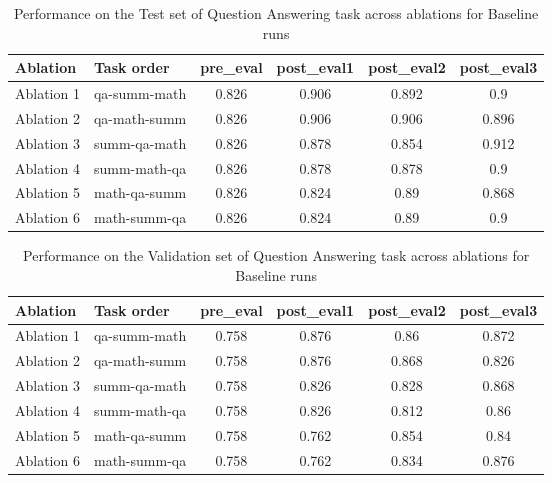 \begin{table}[!ht]
    \centering
    \caption{Performance on the Test set of Question Answering task across ablations for Baseline runs}
    \begin{tabular}{|l|l|S[table-format=2.4]|S[table-format=2.4]|S[table-format=2.4]|S[table-format=2.4]|}
    \hline
        \textbf{Ablation} & \textbf{Task order} & \textbf{pre\_eval} & \textbf{post\_eval1} & \textbf{post\_eval2} & \textbf{post\_eval3 } \\ \hline
        Ablation 1 & qa-summ-math & 0.826 & 0.906 & 0.892 & 0.9  \\ 
        Ablation 2 & qa-math-summ & 0.826 & 0.906 & 0.906 & 0.896  \\ 
        Ablation 3 & summ-qa-math & 0.826 & 0.878 & 0.854 & 0.912  \\ 
        Ablation 4 & summ-math-qa & 0.826 & 0.878 & 0.878 & 0.9  \\ 
        Ablation 5 & math-qa-summ & 0.826 & 0.824 & 0.89 & 0.868  \\ \hline
        Ablation 6 & math-summ-qa & 0.826 & 0.824 & 0.89 & 0.9  \\ \hline
    \end{tabular}
    \label{tab:QATestBaseline}
\end{table}

\begin{table}[!ht]
    \centering
    \caption{Performance on the Validation set of Question Answering task across ablations for Baseline runs}
    \begin{tabular}{|l|l|S[table-format=2.4]|S[table-format=2.4]|S[table-format=2.4]|S[table-format=2.4]|}
    \hline
        \textbf{Ablation} & \textbf{Task order} & \textbf{pre\_eval} & \textbf{post\_eval1} & \textbf{post\_eval2} & \textbf{post\_eval3 } \\ \hline
        Ablation 1 & qa-summ-math & 0.758 & 0.876 & 0.86 & 0.872  \\ 
        Ablation 2 & qa-math-summ & 0.758 & 0.876 & 0.868 & 0.826  \\ 
        Ablation 3 & summ-qa-math & 0.758 & 0.826 & 0.828 & 0.868  \\ 
        Ablation 4 & summ-math-qa & 0.758 & 0.826 & 0.812 & 0.86  \\ 
        Ablation 5 & math-qa-summ & 0.758 & 0.762 & 0.854 & 0.84  \\ 
        Ablation 6 & math-summ-qa & 0.758 & 0.762 & 0.834 & 0.876  \\ \hline
    \end{tabular}
    \label{tab:QAValBaseline}
\end{table}

